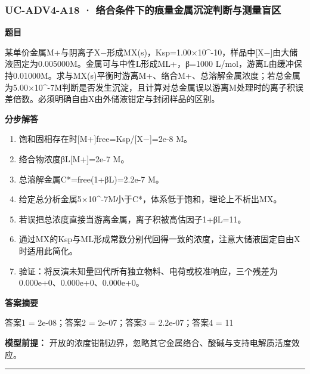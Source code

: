 \documentclass[UTF8,11pt,a4paper]{ctexart}
\begin{document}
\subsubsection*{UC-ADV4-A18 · 络合条件下的痕量金属沉淀判断与测量盲区}
\noindent\textbf{题目}\par
某单价金属M+与阴离子X−形成MX(s)，Ksp=1.00×10\textasciicircum{}-10，样品中[X−]由大储液固定为0.005000M。金属可与中性L形成ML+，β=1000 L/mol，游离L由缓冲保持0.01000M。求与MX(s)平衡时游离M+、络合M+、总溶解金属浓度；若总金属为5.00×10\textasciicircum{}-7M判断是否发生沉淀，且计算对总金属误以游离M处理时的离子积误差倍数。必须明确自由X由外储液钳定与封闭样品的区别。\par
\medskip\noindent\textbf{分步解答}
\begin{enumerate}
\item 饱和固相存在时[M+]free=Ksp/[X−]=2e-8 M。
\item 络合物浓度βL[M+]=2e-7 M。
\item 总溶解金属C*=free(1+βL)=2.2e-7 M。
\item 给定总分析金属5×10\textasciicircum{}-7M小于C*，体系低于饱和，理论上不析出MX。
\item 若误把总浓度直接当游离金属，离子积被高估因子1+βL=11。
\item 通过MX的Ksp与ML形成常数分别代回得一致的浓度，注意大储液固定自由X时适用此简化。
\item 验证：将反演未知量回代所有独立物料、电荷或校准响应，三个残差为0.000e+0、0.000e+0、0.000e+0。
\end{enumerate}
\noindent\textbf{答案摘要}\par
答案1 = 2e-08；答案2 = 2e-07；答案3 = 2.2e-07；答案4 = 11\par
\noindent\textbf{模型前提：}
开放的浓度钳制边界，忽略其它金属络合、酸碱与支持电解质活度效应。\par
\medskip\hrule\medskip
{}
\end{document}
